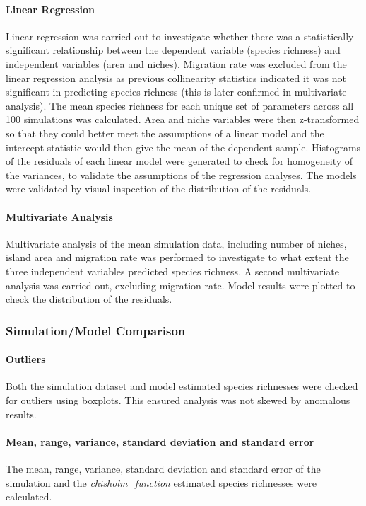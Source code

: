 \documentclass{article}
\begin{document}
\paragraph{Linear Regression}
Linear regression was carried out to investigate whether there was a statistically significant relationship between the dependent variable (species richness) and independent variables (area and niches). Migration rate was excluded from the linear regression analysis as previous collinearity statistics indicated it was not significant in predicting species richness (this is later confirmed in multivariate analysis). The mean species richness for each unique set of parameters across all 100 simulations was calculated. Area and niche variables were then z-transformed so that they could better meet the assumptions of a linear model and the intercept statistic would then give the mean of the dependent sample. Histograms of the residuals of each linear model were generated to check for homogeneity of the variances, to validate the assumptions of the regression analyses. The models were validated by visual inspection of the distribution of the residuals. 

\paragraph{Multivariate Analysis}
Multivariate analysis of the mean simulation data, including number of niches, island area and migration rate was performed to investigate to what extent the three independent variables predicted species richness. A second multivariate analysis was carried out, excluding migration rate. Model results were plotted to check the distribution of the residuals.

\subsubsection{Simulation/Model Comparison}

\paragraph{Outliers}
Both the simulation dataset and model estimated species richnesses were checked for outliers using boxplots. This ensured analysis was not skewed by anomalous results.

\paragraph{Mean, range, variance, standard deviation and standard error}
The mean, range, variance, standard deviation and standard error of the simulation and the \textit{chisholm\_function} estimated species richnesses were calculated. 
\end{document}
